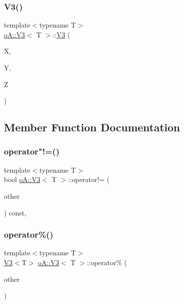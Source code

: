 \subsubsection{\texorpdfstring{V3()}{V3()}\hspace{0.1cm}{\footnotesize\ttfamily [3/3]}}
{\footnotesize\ttfamily template$<$typename T$>$ \\
\mbox{\hyperlink{structo_a_1_1_v3}{o\+A\+::\+V3}}$<$ T $>$\+::\mbox{\hyperlink{structo_a_1_1_v3}{V3}} (\begin{DoxyParamCaption}\item[{const T}]{X,  }\item[{const T}]{Y,  }\item[{const T}]{Z }\end{DoxyParamCaption})\hspace{0.3cm}{\ttfamily [inline]}}



\subsection{Member Function Documentation}
\mbox{\label{structo_a_1_1_v3_ab5f276b206d63965cf0ce028af40363f}} 
\subsubsection{\texorpdfstring{operator"!=()}{operator!=()}}
{\footnotesize\ttfamily template$<$typename T$>$ \\
bool \mbox{\hyperlink{structo_a_1_1_v3}{o\+A\+::\+V3}}$<$ T $>$\+::operator!= (\begin{DoxyParamCaption}\item[{const \mbox{\hyperlink{structo_a_1_1_v3}{o\+A\+::\+V3}}$<$ T $>$ \&}]{other }\end{DoxyParamCaption}) const\hspace{0.3cm}{\ttfamily [inline]}, {\ttfamily [noexcept]}}

\mbox{\label{structo_a_1_1_v3_a22fc8caa2afd56b20cc0239583695014}} 
\subsubsection{\texorpdfstring{operator\%()}{operator\%()}}
{\footnotesize\ttfamily template$<$typename T$>$ \\
\mbox{\hyperlink{structo_a_1_1_v3}{V3}}$<$T$>$ \mbox{\hyperlink{structo_a_1_1_v3}{o\+A\+::\+V3}}$<$ T $>$\+::operator\% (\begin{DoxyParamCaption}\item[{const \mbox{\hyperlink{structo_a_1_1_v3}{o\+A\+::\+V3}}$<$ T $>$ \&}]{other }\end{DoxyParamCaption})\hspace{0.3cm}{\ttfamily [inline]}}

